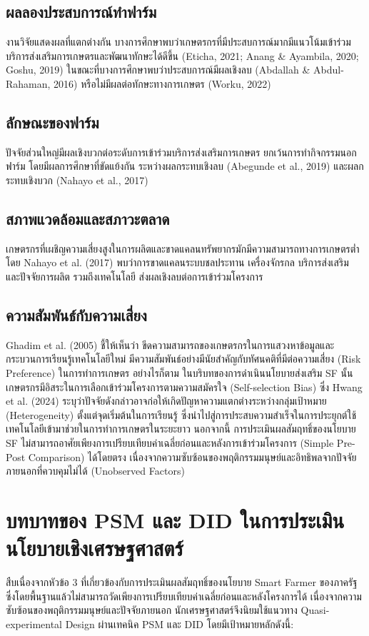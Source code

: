 \subsection{ผลลองประสบการณ์ทำฟาร์ม}
งานวิจัยแสดงผลที่แตกต่างกัน บางการศึกษาพบว่าเกษตรกรที่มีประสบการณ์มากมีแนวโน้มเข้าร่วมบริการส่งเสริมการเกษตรและพัฒนาทักษะได้ดีขึ้น (Eticha, 2021; Anang \& Ayambila, 2020; Goshu, 2019) ในขณะที่บางการศึกษาพบว่าประสบการณ์มีผลเชิงลบ (Abdallah \& Abdul-Rahaman, 2016) หรือไม่มีผลต่อทักษะทางการเกษตร (Worku, 2022)

\subsection{ลักษณะของฟาร์ม}
ปัจจัยส่วนใหญ่มีผลเชิงบวกต่อระดับการเข้าร่วมบริการส่งเสริมการเกษตร ยกเว้นการทำกิจกรรมนอกฟาร์ม โดยมีผลการศึกษาที่ขัดแย้งกัน ระหว่างผลกระทบเชิงลบ (Abegunde et al., 2019) และผลกระทบเชิงบวก (Nahayo et al., 2017)

\subsection{สภาพแวดล้อมและสภาวะตลาด}
เกษตรกรที่เผชิญความเสี่ยงสูงในการผลิตและขาดแคลนทรัพยากรมักมีความสามารถทางการเกษตรต่ำ โดย Nahayo et al. (2017) พบว่าการขาดแคลนระบบชลประทาน เครื่องจักรกล บริการส่งเสริม และปัจจัยการผลิต รวมถึงเทคโนโลยี ส่งผลเชิงลบต่อการเข้าร่วมโครงการ
\subsection{ความสัมพันธ์กับความเสี่ยง}
Ghadim et al. (2005) ชี้ให้เห็นว่า ขีดความสามารถของเกษตรกรในการแสวงหาข้อมูลและกระบวนการเรียนรู้เทคโนโลยีใหม่ มีความสัมพันธ์อย่างมีนัยสำคัญกับทัศนคติที่มีต่อความเสี่ยง (Risk Preference) ในการทำการเกษตร
อย่างไรก็ตาม ในบริบทของการดำเนินนโยบายส่งเสริม SF นั้น เกษตรกรมีอิสระในการเลือกเข้าร่วมโครงการตามความสมัครใจ (Self-selection Bias) ซึ่ง Hwang et al. (2024) ระบุว่าปัจจัยดังกล่าวอาจก่อให้เกิดปัญหาความแตกต่างระหว่างกลุ่มเป้าหมาย (Heterogeneity) ตั้งแต่จุดเริ่มต้นในการเรียนรู้
ซึ่งนำไปสู่การประสบความสำเร็จในการประยุกต์ใช้เทคโนโลยีเข้ามาช่วยในการทำการเกษตรในระยะยาว นอกจากนี้ การประเมินผลสัมฤทธิ์ของนโยบาย SF ไม่สามารถอาศัยเพียงการเปรียบเทียบค่าเฉลี่ยก่อนและหลังการเข้าร่วมโครงการ (Simple Pre-Post Comparison) ได้โดยตรง เนื่องจากความซับซ้อนของพฤติกรรมมนุษย์และอิทธิพลจากปัจจัยภายนอกที่ควบคุมไม่ได้ (Unobserved Factors)

\section{บทบาทของ PSM และ DID ในการประเมินนโยบายเชิงเศรษฐศาสตร์}
สืบเนื่องจากหัวข้อ 3 ที่เกี่ยวข้องกับการประเมินผลสัมฤทธิ์ของนโยบาย Smart Farmer ของภาครัฐ ซึ่งโดยพื้นฐานแล้วไม่สามารถวัดเพียงการเปรียบเทียบค่าเฉลี่ยก่อนและหลังโครงการได้ เนื่องจากความซับซ้อนของพฤติกรรมมนุษย์และปัจจัยภายนอก นักเศรษฐศาสตร์จึงนิยมใช้แนวทาง Quasi-experimental Design ผ่านเทคนิค PSM และ DID โดยมีเป้าหมายหลักดังนี้:

